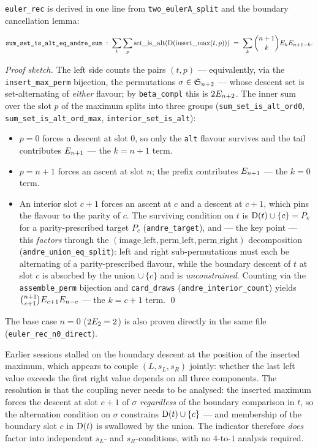 \noindent \texttt{euler\_rec} is derived in one line from
\texttt{two\_eulerA\_split} and the boundary cancellation lemma:

\[
  \texttt{sum\_set\_is\_alt\_eq\_andre\_sum} \;:\;
  \sum_{t} \sum_{p} \mathrm{set\_is\_alt}(\mathrm{D}(\mathrm{insert\_max}(t, p)))
  \;=\; \sum_{k} \binom{n+1}{k} E_k E_{n+1-k}.
\]

\noindent
\emph{Proof sketch.} The left side counts the pairs $(t, p)$ ---
equivalently, via the \texttt{insert\_max\_perm} bijection, the
permutations $\sigma \in \mathfrak{S}_{n+2}$ --- whose descent set is
set-alternating of \emph{either} flavour; by
\texttt{beta\_compl} this is $2E_{n+2}$. The inner sum over the
slot $p$ of the maximum splits into three groups
(\texttt{sum\_set\_is\_alt\_ord0},
\texttt{sum\_set\_is\_alt\_ord\_max},
\texttt{interior\_set\_is\_alt}):
\begin{itemize}
  \item $p = 0$ forces a descent at slot $0$, so only the
    \texttt{alt} flavour survives and the tail contributes
    $E_{n+1}$ --- the $k = n+1$ term.
  \item $p = n+1$ forces an ascent at slot $n$; the prefix
    contributes $E_{n+1}$ --- the $k = 0$ term.
  \item An interior slot $c+1$ forces an ascent at $c$ and a
    descent at $c+1$, which pins the flavour to the parity of $c$.
    The surviving condition on $t$ is
    $\mathrm{D}(t) \cup \{c\} = P_c$ for a parity-prescribed target
    $P_c$ (\texttt{andre\_target}), and --- the key point --- this
    \emph{factors} through the
    $(\mathrm{image\_left}, \mathrm{perm\_left}, \mathrm{perm\_right})$
    decomposition (\texttt{andre\_union\_eq\_split}): left and
    right sub-permutations must each be alternating of a
    parity-prescribed flavour, while the boundary descent of $t$
    at slot $c$ is absorbed by the union $\cup\,\{c\}$ and is
    \emph{unconstrained}. Counting via the \texttt{assemble\_perm}
    bijection and \texttt{card\_draws}
    (\texttt{andre\_interior\_count}) yields
    $\binom{n+1}{c+1} E_{c+1} E_{n-c}$ --- the $k = c+1$
    term. \qed
\end{itemize}

\noindent The base case $n = 0$ ($2E_2 = 2$) is also proven
directly in the same file (\texttt{euler\_rec\_n0\_direct}).

\begin{remark}
Earlier sessions stalled on the boundary descent at the position of
the inserted maximum, which appears to couple $(L, s_L, s_R)$
jointly: whether the last left value exceeds the first right value
depends on all three components. The resolution is that the
coupling never needs to be analysed: the inserted maximum forces
the descent at slot $c+1$ of $\sigma$ \emph{regardless} of the
boundary comparison in $t$, so the alternation condition on
$\sigma$ constrains $\mathrm{D}(t) \cup \{c\}$ --- and membership of
the boundary slot $c$ in $\mathrm{D}(t)$ is swallowed by the union.
The indicator therefore \emph{does} factor into independent
$s_L$- and $s_R$-conditions, with no $4$-to-$1$ analysis required.
\end{remark}

